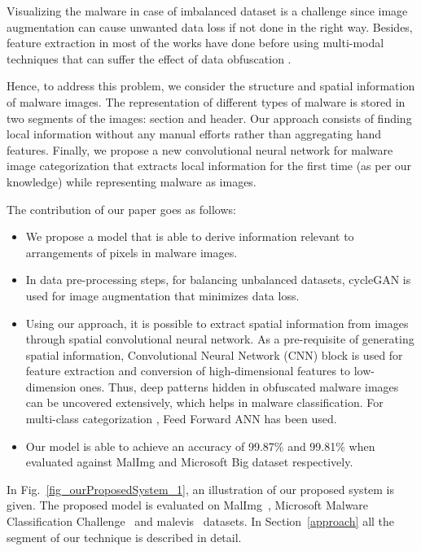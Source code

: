 \documentclass[pdflatex,sn-mathphys]{sn-jnl}%
\begin{document}
\color{blue}
\par Visualizing the malware in case of imbalanced dataset is a challenge since image augmentation can cause unwanted data loss if not done in the right way. Besides, feature extraction in most of the works have done before using multi-modal techniques that can suffer the effect of data obfuscation \cite{37}. 

\color{black}
Hence, to address this problem, we consider the structure and spatial information of malware images. The representation of different types of malware is stored in two segments of the images: section and header. Our approach consists of finding local information without any manual efforts rather than aggregating hand features. Finally, we propose a new convolutional neural network for malware image categorization that extracts local information for the first time (as per our knowledge) while representing malware as images. 
\color{blue}
\par The contribution of our paper goes as follows:
\begin{itemize}
  \item We propose a model that is able to derive information relevant to arrangements of  pixels in malware images. 
  \item In data pre-processing steps, for balancing unbalanced datasets, cycleGAN is used for image augmentation that minimizes data loss.
  \item Using our approach, it is possible to extract spatial information from images through spatial convolutional neural network. As a pre-requisite of generating spatial information, Convolutional Neural Network (CNN) block is used for feature extraction and conversion of high-dimensional features to low-dimension ones.  Thus, deep patterns hidden in obfuscated malware images can be uncovered extensively, which helps in malware classification. For multi-class categorization , Feed Forward ANN has been used. 
  \item Our model is able to achieve an accuracy of 99.87\% and 99.81\% when evaluated against MalImg and Microsoft Big dataset respectively. 
\end{itemize}
\color{black}
In Fig.~\ref{fig_ourProposedSystem_1}, an illustration of our proposed system is given. The proposed model is evaluated on MalImg~\cite{11}, Microsoft Malware Classification Challenge~\cite{10} and malevis~\cite{39} datasets. In Section~\ref{approach} all the segment of our technique is described in detail.
\end{document}
